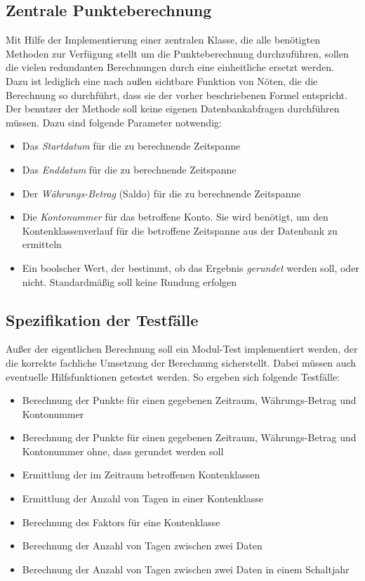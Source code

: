 \documentclass[12pt]{scrreprt}
\begin{document}
\subsection{Zentrale Punkteberechnung}
Mit Hilfe der Implementierung einer zentralen Klasse, die alle benötigten Methoden zur Verfügung stellt um die Punkteberechnung durchzuführen, sollen die vielen redundanten Berechnungen durch eine einheitliche ersetzt werden. Dazu ist lediglich eine nach außen sichtbare Funktion von Nöten, die die Berechnung so durchführt, dass sie der vorher beschriebenen Formel entspricht. Der benutzer der Methode soll keine eigenen Datenbankabfragen durchführen müssen. Dazu sind folgende Parameter notwendig:

\begin{itemize}
  \item Das \emph{Startdatum} für die zu berechnende Zeitspanne
  \item Das \emph{Enddatum} für die zu berechnende Zeitspanne
  \item Der \emph{Währungs-Betrag} (Saldo) für die zu berechnende Zeitspanne
  \item Die \emph{Kontonummer} für das betroffene Konto. Sie wird benötigt, um den Kontenklassenverlauf für die betroffene Zeitspanne aus der Datenbank zu ermitteln
  \item Ein boolscher Wert, der bestimmt, ob das Ergebnis \emph{gerundet} werden soll, oder nicht. Standardmäßig soll keine Rundung erfolgen
\end{itemize}

\subsection{Spezifikation der Testfälle}
Außer der eigentlichen Berechnung soll ein Modul-Test implementiert werden, der die korrekte fachliche Umsetzung der Berechnung sicherstellt. Dabei müssen auch eventuelle Hilfsfunktionen getestet werden. So ergeben sich folgende Testfälle:

\begin{itemize}
  \item Berechnung der Punkte für einen gegebenen Zeitraum, Währungs-Betrag und Kontonummer
  \item Berechnung der Punkte für einen gegebenen Zeitraum, Währungs-Betrag und Kontonummer ohne, dass gerundet werden soll
  \item Ermittlung der im Zeitraum betroffenen Kontenklassen
  \item Ermittlung der Anzahl von Tagen in einer Kontenklasse
  \item Berechnung des Faktors für eine Kontenklasse
  \item Berechnung der Anzahl von Tagen zwischen zwei Daten
  \item Berechnung der Anzahl von Tagen zwischen zwei Daten in einem Schaltjahr  
\end{itemize}
\end{document}
